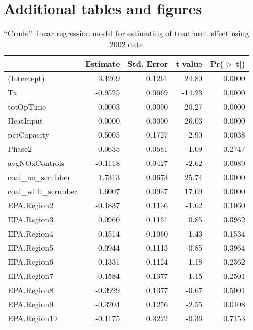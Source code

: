 
\section{Additional tables and figures}


\begin{table}[ht]
\centering
\begin{tabular}{lrrrr}
  \toprule
                       & Estimate & Std. Error & t value & Pr($>$$|$t$|$) \\ 
  \midrule
(Intercept)            & 3.1269   & 0.1261     & 24.80   & 0.0000         \\ \midrule
  Tx                   & -0.9525  & 0.0669     & -14.23  & 0.0000         \\ \midrule
  totOpTime            & 0.0003   & 0.0000     & 20.27   & 0.0000         \\ 
  HeatInput            & 0.0000   & 0.0000     & 26.03   & 0.0000         \\ 
  pctCapacity          & -0.5005  & 0.1727     & -2.90   & 0.0038         \\ 
  Phase2               & -0.0635  & 0.0581     & -1.09   & 0.2747         \\ 
  avgNOxControls       & -0.1118  & 0.0427     & -2.62   & 0.0089         \\ 
  coal\_no\_scrubber   & 1.7313   & 0.0673     & 25.74   & 0.0000         \\ 
  coal\_with\_scrubber & 1.6007   & 0.0937     & 17.09   & 0.0000         \\ 
  EPA.Region2          & -0.1837  & 0.1136     & -1.62   & 0.1060         \\ 
  EPA.Region3          & 0.0960   & 0.1131     & 0.85    & 0.3962         \\ 
  EPA.Region4          & 0.1514   & 0.1060     & 1.43    & 0.1534         \\ 
  EPA.Region5          & -0.0944  & 0.1113     & -0.85   & 0.3964         \\ 
  EPA.Region6          & 0.1331   & 0.1124     & 1.18    & 0.2362         \\ 
  EPA.Region7          & -0.1584  & 0.1377     & -1.15   & 0.2501         \\ 
  EPA.Region8          & -0.0929  & 0.1377     & -0.67   & 0.5001         \\ 
  EPA.Region9          & -0.3204  & 0.1256     & -2.55   & 0.0108         \\ 
  EPA.Region10         & -0.1175  & 0.3222     & -0.36   & 0.7153         \\ 
   \bottomrule
\end{tabular}
\caption{``Crude'' linear regression model for estimating of treatment
  effect using 2002 data}
\label{tab:crude-lm-02}
\end{table}



